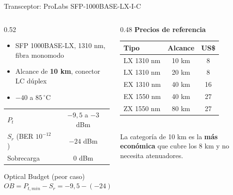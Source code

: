 \begin{frame}{Transceptor: ProLabs SFP-1000BASE-LX-I-C}
  \begin{columns}[T]
    \begin{column}{0.52\textwidth}
      \begin{itemize}
        \item SFP 1000BASE-LX, 1310 nm, fibra monomodo
        \item Alcance de \textbf{10 km}, conector LC dúplex
        \item $-40$ a $85\,^\circ$C
      \end{itemize}
      \vspace{0.1cm}
      \begin{tabular}{lc}
        \toprule
        $P_t$ & $-9{,}5$ a $-3$ dBm \\
        $S_r$ (BER $10^{-12}$) & $-24$ dBm \\
        Sobrecarga & $0$ dBm \\
        \bottomrule
      \end{tabular}
      \vspace{0.2cm}
      \begin{block}{Optical Budget (peor caso)}
        \centering
        $OB = P_{t,min} - S_r = -9{,}5 - (-24) = \mathbf{14{,}5\ dB}$
      \end{block}
    \end{column}
    \begin{column}{0.48\textwidth}
      \centering
      \textbf{Precios de referencia}\\[0.1cm]
      \small
      \begin{tabular}{lcc}
        \toprule
        \textbf{Tipo} & \textbf{Alcance} & \textbf{US\$} \\
        \midrule
        LX 1310 nm & 10 km & 8 \\
        LX 1310 nm & 20 km & 8 \\
        EX 1310 nm & 40 km & 16 \\
        EX 1550 nm & 40 km & 27 \\
        ZX 1550 nm & 80 km & 27 \\
        \bottomrule
      \end{tabular}\\[0.2cm]
      \normalsize La categoría de 10 km es la \textbf{más económica} que cubre los 8 km y no necesita atenuadores.
    \end{column}
  \end{columns}
\end{frame}

